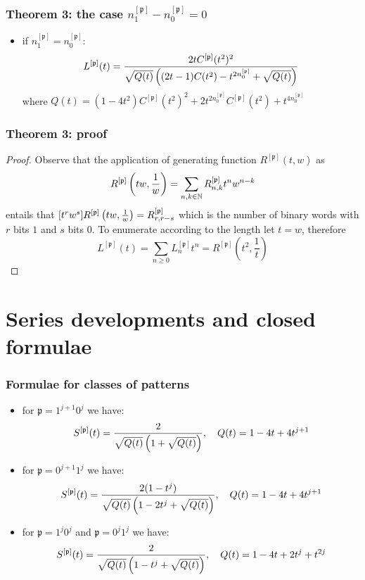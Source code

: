 \documentclass{beamer}
\begin{document}
\begin{frame}\frametitle{Theorem 3: the case $n_1^{[\mathfrak{p}]}-n_0^{[\mathfrak{p}]}=0$}
\begin{itemize}
\item if $n_1^{[\mathfrak{p}]}=n_0^{[\mathfrak{p}]}:$ $$L^{[\mathfrak{p}]}(t)=
{2tC^{[\mathfrak{p}]}(t^2)^2 \over \sqrt{ Q(t)
}\left((2t-1)C(t^2)-t^{2n_0^{[\mathfrak{p}]}} + \sqrt{ Q(t) } \right)}$$
where
$Q(t)=(1-4t^2)C^{[\mathfrak{p}]}(t^2)^2+2t^{2n_0^{[\mathfrak{p}]}}C^{[\mathfrak{p}]}(t^2)+t^{4n_0^{[\mathfrak{p}]}}$
\end{itemize}
\end{frame}

\begin{frame}\frametitle{Theorem 3: proof}
\begin{proof}
Observe that the application of generating function $R^{[\mathfrak{p}]}(t, w)$ as
\begin{displaymath}
 R^{[\mathfrak{p}]}\left(tw,{1 \over w}\right)=\sum_{n,k\in\mathbb{N}} R_{n, k}^{[\mathfrak{p}]}t^n w^{n-k}
\end{displaymath}
entails that $[t^{r}w^{s}]R^{[\mathfrak{p}]}\left(tw,{1 \over w}\right)=R_{r,
r-s}^{[\mathfrak{p}]}$ which is the number of binary words with $r$ bits $1$
and $s$ bits $0$. To enumerate according to the length let $t=w$, therefore
$$L^{[\mathfrak{p}]}(t)=\sum_{n\geq 0}L_n^{[\mathfrak{p}]}t^n=R^{[\mathfrak{p}]}\left(t^2,\frac{1}{t}\right)$$
\end{proof}
\end{frame}


\section{Series developments and closed formulae}

\begin{frame}\frametitle{Formulae for classes of patterns}
{\small
\begin{itemize}

\item for $\mathfrak{p}=1^{j+1}0^j$ we have:
$$ S^{[\mathfrak{p}]}(t)={2 \over \sqrt{Q(t)}\left(1+ \sqrt{Q(t)}\right) }, \quad Q(t)=1-4t+4t^{j+1}$$

\item for $\mathfrak{p}=0^{j+1}1^j$ we have:
$$ S^{[\mathfrak{p}]}(t)={2(1-t^j) \over \sqrt{Q(t)} \left(1-2t^j+ \sqrt{Q(t)}\right)}, \quad Q(t)=1-4t+4t^{j+1}$$

\item for $\mathfrak{p}=1^{j}0^j$ and $\mathfrak{p}=0^{j}1^j$ we have:
$$ S^{[\mathfrak{p}]}(t)={2 \over \sqrt{Q(t)} \left(1-t^j+\sqrt{Q(t)}  \right)}, \quad Q(t)=1-4t+2t^j+t^{2j}$$

\end{itemize}
}
\end{frame}
\end{document}

